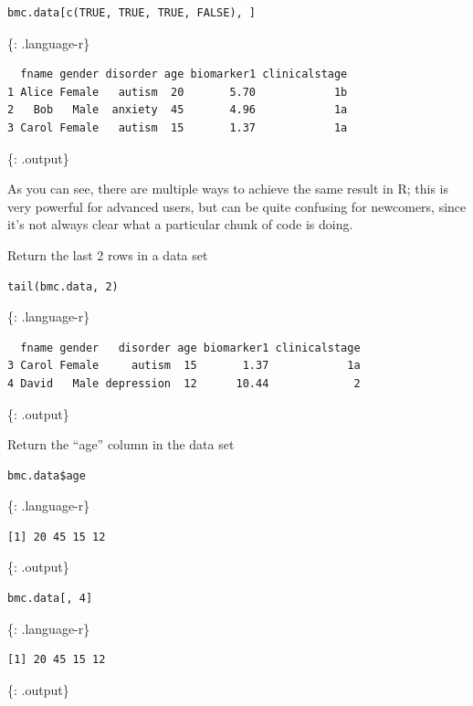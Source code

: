 \documentclass[]{article}
\begin{document}
\begin{verbatim}
bmc.data[c(TRUE, TRUE, TRUE, FALSE), ]
\end{verbatim}

\{: .language-r\}

\begin{verbatim}
  fname gender disorder age biomarker1 clinicalstage
1 Alice Female   autism  20       5.70            1b
2   Bob   Male  anxiety  45       4.96            1a
3 Carol Female   autism  15       1.37            1a
\end{verbatim}

\{: .output\}

As you can see, there are multiple ways to achieve the same result in R;
this is very powerful for advanced users, but can be quite confusing for
newcomers, since it's not always clear what a particular chunk of code
is doing.

Return the last 2 rows in a data set

\begin{verbatim}
tail(bmc.data, 2)
\end{verbatim}

\{: .language-r\}

\begin{verbatim}
  fname gender   disorder age biomarker1 clinicalstage
3 Carol Female     autism  15       1.37            1a
4 David   Male depression  12      10.44             2
\end{verbatim}

\{: .output\}

Return the ``age'' column in the data set

\begin{verbatim}
bmc.data$age
\end{verbatim}

\{: .language-r\}

\begin{verbatim}
[1] 20 45 15 12
\end{verbatim}

\{: .output\}

\begin{verbatim}
bmc.data[, 4]
\end{verbatim}

\{: .language-r\}

\begin{verbatim}
[1] 20 45 15 12
\end{verbatim}

\{: .output\}
\end{document}
